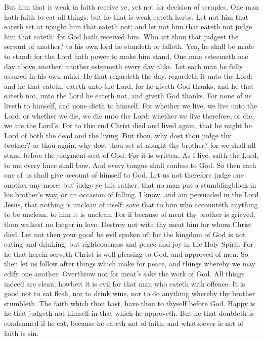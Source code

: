 But him that is weak in faith receive ye, yet not for decision of scruples. One man hath faith to eat all things: but he that is weak eateth herbs. Let not him that eateth set at nought him that eateth not; and let not him that eateth not judge him that eateth: for God hath received him. Who art thou that judgest the servant of another? to his own lord he standeth or falleth. Yea, he shall be made to stand; for the Lord hath power to make him stand. One man esteemeth one day above another: another esteemeth every day alike. Let each man be fully assured in his own mind. He that regardeth the day, regardeth it unto the Lord: and he that eateth, eateth unto the Lord, for he giveth God thanks; and he that eateth not, unto the Lord he eateth not, and giveth God thanks. For none of us liveth to himself, and none dieth to himself. For whether we live, we live unto the Lord; or whether we die, we die unto the Lord: whether we live therefore, or die, we are the Lord’s. For to this end Christ died and lived again, that he might be Lord of both the dead and the living. But thou, why dost thou judge thy brother? or thou again, why dost thou set at nought thy brother? for we shall all stand before the judgment-seat of God. For it is written, As I live, saith the Lord, to me every knee shall bow, And every tongue shall confess to God.  So then each one of us shall give account of himself to God.  Let us not therefore judge one another any more: but judge ye this rather, that no man put a stumblingblock in his brother’s way, or an occasion of falling. I know, and am persuaded in the Lord Jesus, that nothing is unclean of itself: save that to him who accounteth anything to be unclean, to him it is unclean. For if because of meat thy brother is grieved, thou walkest no longer in love. Destroy not with thy meat him for whom Christ died. Let not then your good be evil spoken of: for the kingdom of God is not eating and drinking, but righteousness and peace and joy in the Holy Spirit. For he that herein serveth Christ is well-pleasing to God, and approved of men. So then let us follow after things which make for peace, and things whereby we may edify one another. Overthrow not for meat’s sake the work of God. All things indeed are clean; howbeit it is evil for that man who eateth with offence. It is good not to eat flesh, nor to drink wine, nor to do anything whereby thy brother stumbleth. The faith which thou hast, have thou to thyself before God. Happy is he that judgeth not himself in that which he approveth. But he that doubteth is condemned if he eat, because he eateth not of faith; and whatsoever is not of faith is sin. 

